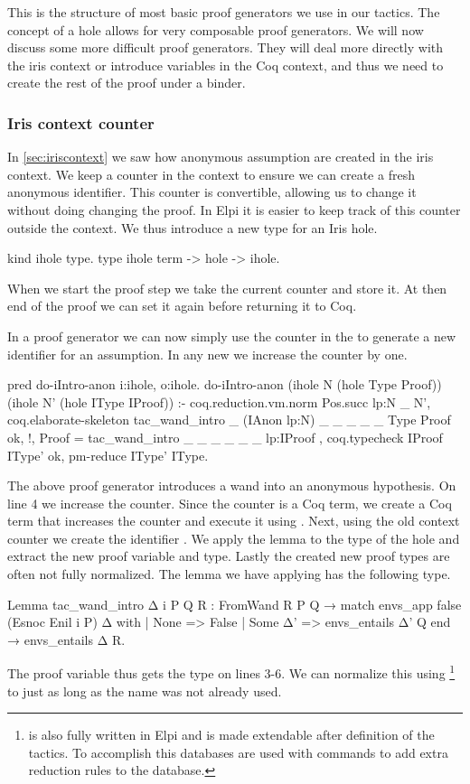 \documentclass[thesis.tex]{subfiles}
\begin{document}
{{{{This is the structure of most basic proof generators we use in our tactics. The concept of a hole allows for very composable proof generators. We will now discuss some more difficult proof generators. They will deal more directly with the iris context or introduce variables in the Coq context, and thus we need to create the rest of the proof under a binder.

\subsubsection{Iris context counter}\label{ssec:cecontextcounter}
In \cref{sec:iriscontext} we saw how anonymous assumption are created in the iris context. We keep a counter in the context to ensure we can create a fresh anonymous identifier. This counter is convertible, allowing us to change it without doing changing the proof. In Elpi it is easier to keep track of this counter outside the context. We thus introduce a new type for an Iris hole.
\begin{elpicode}
  kind ihole type.
  type ihole term -> hole -> ihole. %
\end{elpicode}
When we start the proof step we take the current counter and store it. At then end of the proof we can set it again before returning it to Coq.

In a proof generator we can now simply use the counter in the  to generate a new identifier for an assumption. In any new  we increase the counter by one.
\begin{elpicode}
  pred do-iIntro-anon i:ihole, o:ihole.
  do-iIntro-anon (ihole N (hole Type Proof)) 
                 (ihole N' (hole IType IProof)) :-
    coq.reduction.vm.norm {{ Pos.succ lp:N }} _ N',
    coq.elaborate-skeleton 
      {{ tac_wand_intro _ (IAnon lp:N) _ _ _ _ _ }} 
      Type Proof ok, !,
    Proof = {{ tac_wand_intro _ _ _ _ _ _ lp:IProof }}, 
    coq.typecheck IProof IType' ok,
    pm-reduce IType' IType.
\end{elpicode}
The above proof generator introduces a wand into an anonymous hypothesis. On line 4 we increase the counter. Since the counter is a Coq term, we create a Coq term that increases the counter and execute it using . Next, using the old context counter we create the identifier . We apply the lemma to the type of the hole and extract the new proof variable and type. Lastly the created new proof types are often not fully normalized. The lemma we have applying has the following type.
\begin{coqcode}
  Lemma tac_wand_intro Δ i P Q R :
    FromWand R P Q →
    match envs_app false (Esnoc Enil i P) Δ with
    | None => False
    | Some Δ' => envs_entails Δ' Q
    end →
    envs_entails Δ R.
\end{coqcode}
The proof variable thus gets the type on lines 3-6. We can normalize this using \footnote{ is also fully written in Elpi and is made extendable after definition of the tactics. To accomplish this \ce databases are used with commands to add extra reduction rules to the database.} to just  as long as the name was not already used.


}}}}
\end{document}

